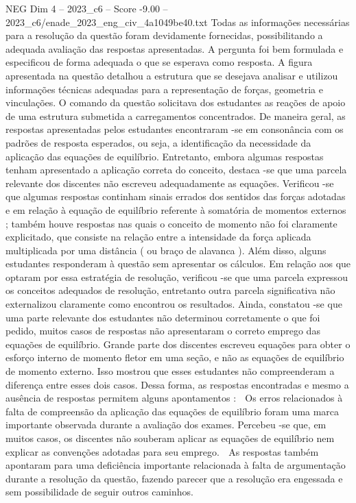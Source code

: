 \begin{textsample}{NEG Dim 4 – 2023\_c6 – Score -9.00 – 2023\_c6/enade\_2023\_eng\_civ\_4a1049be40.txt}
Todas as informações necessárias para a resolução da questão foram devidamente fornecidas, possibilitando a adequada avaliação das respostas apresentadas.
A pergunta foi bem formulada e especificou de forma adequada o que se esperava como resposta.
A figura apresentada na questão detalhou a estrutura que se desejava analisar e utilizou informações técnicas adequadas para a representação de forças, geometria e vinculações.
O comando da questão solicitava dos estudantes as reações de apoio de uma estrutura submetida a carregamentos concentrados.
De maneira geral, as respostas apresentadas pelos estudantes encontraram -se em consonância com os padrões de resposta esperados, ou seja, a identificação da necessidade da aplicação das equações de equilíbrio.
Entretanto, embora algumas respostas tenham apresentado a aplicação correta do conceito, destaca -se que uma parcela relevante dos discentes não escreveu adequadamente as equações.
Verificou -se que algumas respostas continham sinais errados dos sentidos das forças adotadas e em relação à equação de equilíbrio referente à somatória de momentos externos ; também houve respostas nas quais o conceito de momento não foi claramente explicitado, que consiste na relação entre a intensidade da força aplicada multiplicada por uma distância ( ou braço de alavanca ).
Além disso, alguns estudantes responderam à questão sem apresentar os cálculos.
Em relação aos que optaram por essa estratégia de resolução, verificou -se que uma parcela expressou os conceitos adequados de resolução, entretanto outra parcela significativa não externalizou claramente como encontrou os resultados.
Ainda, constatou -se que uma parte relevante dos estudantes não determinou corretamente o que foi pedido, muitos casos de respostas não apresentaram o correto emprego das equações de equilíbrio.
Grande parte dos discentes escreveu equações para obter o esforço interno de momento fletor em uma seção, e não as equações de equilíbrio de momento externo.
Isso mostrou que esses estudantes não compreenderam a diferença entre esses dois casos.
Dessa forma, as respostas encontradas e mesmo a ausência de respostas permitem alguns apontamentos :  Os erros relacionados à falta de compreensão da aplicação das equações de equilíbrio foram uma marca importante observada durante a avaliação dos exames.
Percebeu -se que, em muitos casos, os discentes não souberam aplicar as equações de equilíbrio nem explicar as convenções adotadas para seu emprego.  As respostas também apontaram para uma deficiência importante relacionada à falta de argumentação durante a resolução da questão, fazendo parecer que a resolução era engessada e sem possibilidade de seguir outros caminhos.

\end{textsample}
